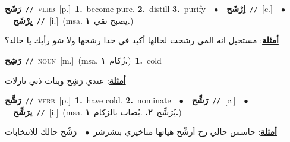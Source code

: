\documentclass[10pt,a4paper,twoside]{article} %
\begin{document}
\begin{multicols}{2}
{\setlength\topsep{0pt}\textbf{\foreignlanguage{arabic}{رَشَح}}\ {\color{gray}\texttt{//}\color{black}}\ \textsc{verb}\ [p.]\ \textbf{1.}~become pure.  \textbf{2.}~distill  \textbf{3.}~purify\ \ $\bullet$\ \ \setlength\topsep{0pt}\textbf{\foreignlanguage{arabic}{اِرْشَح}}\ {\color{gray}\texttt{//}\color{black}}\ [c.]\ \ $\bullet$\ \ \setlength\topsep{0pt}\textbf{\foreignlanguage{arabic}{يِرْشَح}}\ {\color{gray}\texttt{//}\color{black}}\ [i.]\ \color{gray}(msa. \foreignlanguage{arabic}{يصبح نقي}~\foreignlanguage{arabic}{\textbf{١.}})\color{black}\  \begin{flushright}\color{gray}\foreignlanguage{arabic}{\textbf{\underline{\foreignlanguage{arabic}{أمثلة}}}: مستحيل انه المي رشحت لحالها أكيد في حدا رشحها ولا شو رأيك يا خالد؟}\end{flushright}\color{black}} \vspace{2mm}

{\setlength\topsep{0pt}\textbf{\foreignlanguage{arabic}{رَشِح}}\ {\color{gray}\texttt{//}\color{black}}\ \textsc{noun}\ [m.]\ \color{gray}(msa. \foreignlanguage{arabic}{زُكام}~\foreignlanguage{arabic}{\textbf{١.}})\color{black}\ \textbf{1.}~cold\  \begin{flushright}\color{gray}\foreignlanguage{arabic}{\textbf{\underline{\foreignlanguage{arabic}{أمثلة}}}: عندي رَشِح وبنات ذني نازلات}\end{flushright}\color{black}} \vspace{2mm}

{\setlength\topsep{0pt}\textbf{\foreignlanguage{arabic}{رَشَّح}}\ {\color{gray}\texttt{//}\color{black}}\ \textsc{verb}\ [p.]\ \textbf{1.}~have cold.  \textbf{2.}~nominate\ \ $\bullet$\ \ \setlength\topsep{0pt}\textbf{\foreignlanguage{arabic}{رَشِّح}}\ {\color{gray}\texttt{//}\color{black}}\ [c.]\ \ $\bullet$\ \ \setlength\topsep{0pt}\textbf{\foreignlanguage{arabic}{يرَشِّح}}\ {\color{gray}\texttt{//}\color{black}}\ [i.]\ \color{gray}(msa. \foreignlanguage{arabic}{يُرَشِّح}~\foreignlanguage{arabic}{\textbf{٢.}}  .\foreignlanguage{arabic}{يُصاب بالزكام}~\foreignlanguage{arabic}{\textbf{١.}})\color{black}\  \begin{flushright}\color{gray}\foreignlanguage{arabic}{\textbf{\underline{\foreignlanguage{arabic}{أمثلة}}}: حاسس حالي رح أرشِّح هياتها مناخيري بتشرشر\ $\bullet$\ \  رَشِّح حالك للانتخابات}\end{flushright}\color{black}} \vspace{2mm}


\end{multicols}
\end{document}
